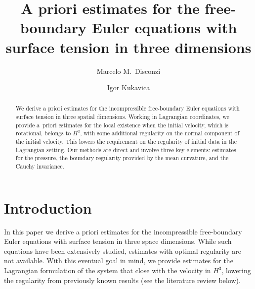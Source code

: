 \documentclass[10pt,reqno]{amsart}
\title[Free-boundary Euler]{A priori estimates for the free-boundary Euler equations
 with surface tension
 in three
dimensions}
\author[Disconzi]{Marcelo M.~Disconzi}
\author[Kukavica]{Igor Kukavica}
\theoremstyle{plain}
\theoremstyle{definition}
\numberwithin{equation}{section}
\begin{document}
\maketitle

\begin{abstract}
We derive a priori estimates for the incompressible free-boundary Euler equations
with surface tension
in three spatial dimensions.
Working in Lagrangian coordinates,
we provide a~priori estimates for the local existence when the initial
velocity, which is rotational,
belongs to $H^3$, with some additional regularity on the normal component
of the initial velocity. This lowers the requirement on the regularity of initial
data in the Lagrangian setting.
Our methods are direct and involve
three key elements: estimates for the pressure, the boundary regularity 
provided by the mean curvature, and the Cauchy invariance.
\end{abstract}




\section{Introduction\label{section_intro}}
In this paper we derive a priori estimates for the incompressible free-boundary 
Euler equations with surface tension in three space dimensions. 
While such equations
have been extensively studied,
estimates with optimal regularity are not available. With this eventual goal in mind,
we  provide estimates for the Lagrangian
formulation of the system that close with the velocity in $H^{3}$,
lowering the regularity from previously known results (see the literature review below).
\end{document}
